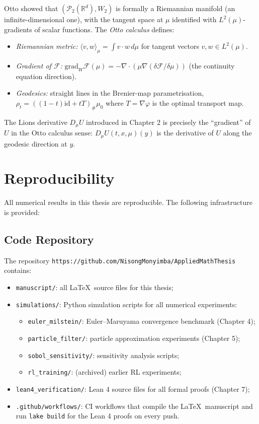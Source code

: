 Otto \citep{otto2001} showed that $(\mathcal{P}_2(\mathbb{R}^d), W_2)$ is
formally a Riemannian manifold (an infinite-dimensional one), with the tangent
space at $\mu$ identified with $L^2(\mu)$-gradients of scalar functions. The
\emph{Otto calculus} defines:
\begin{itemize}
    \item \textit{Riemannian metric:} $\langle v, w \rangle_\mu = \int v \cdot w\,
    d\mu$ for tangent vectors $v, w \in L^2(\mu)$.
    \item \textit{Gradient of $\mathcal{F}$:} $\mathrm{grad}_W \mathcal{F}(\mu)
    = -\nabla \cdot (\mu \nabla (\delta\mathcal{F}/\delta\mu))$ (the continuity
    equation direction).
    \item \textit{Geodesics:} straight lines in the Brenier-map parametrisation,
    $\rho_t = ((1-t)\mathrm{id} + t T)_\# \mu_0$ where $T = \nabla\varphi$ is
    the optimal transport map.
\end{itemize}
The Lions derivative $D_\mu U$ introduced in Chapter 2 is precisely the
``gradient'' of $U$ in the Otto calculus sense: $D_\mu U(t,x,\mu)(y)$ is the
derivative of $U$ along the geodesic direction at $y$.

\section{Reproducibility}
\label{sec:sc-reproducibility}

All numerical results in this thesis are reproducible. The following
infrastructure is provided:

\subsection{Code Repository}

The repository \texttt{https://github.com/NisongMonyimba/AppliedMathThesis}
contains:
\begin{itemize}
    \item \texttt{manuscript/}: all \LaTeX\ source files for this thesis;
    \item \texttt{simulations/}: Python simulation scripts for all numerical
    experiments:
    \begin{itemize}
        \item \texttt{euler\_milstein/}: Euler--Maruyama convergence benchmark
        (Chapter 4);
        \item \texttt{particle\_filter/}: particle approximation experiments
        (Chapter 5);
        \item \texttt{sobol\_sensitivity/}: sensitivity analysis scripts;
        \item \texttt{rl\_training/}: (archived) earlier RL experiments;
    \end{itemize}
    \item \texttt{lean4\_verification/}: Lean 4 source files for all formal
    proofs (Chapter 7);
    \item \texttt{.github/workflows/}: CI workflows that compile the \LaTeX\
    manuscript and run \texttt{lake build} for the Lean 4 proofs on every push.
\end{itemize}


